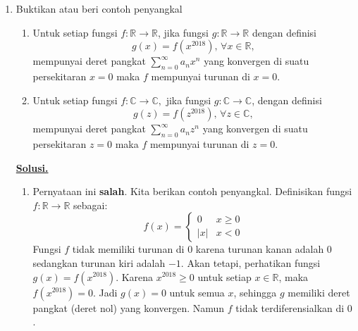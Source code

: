 \documentclass[12pt,twoside]{article}
\newenvironment{solution}
{
	\par\noindent\textbf{\underline{Solusi.}}\\
}
{
	\par
}
\begin{document}
\begin{enumerate}
  \item Buktikan atau beri contoh penyangkal
        \begin{enumerate}
          \item Untuk setiap fungsi $f:\mathbb{R}\to\mathbb{R}$, jika fungsi $g:\mathbb{R}\to\mathbb{R}$ dengan definisi
                \begin{equation*}
                  g(x) = f(x^{2018}), \,\forall x \in \mathbb{R},
                \end{equation*}
                mempunyai deret pangkat $\displaystyle\sum_{n=0}^{\infty} a_nx^n$ yang konvergen di suatu persekitaran $x=0$ maka $f$ mempunyai turunan di $x=0$.
          \item Untuk setiap fungsi $f:\mathbb{C}\to\mathbb{C},$ jika fungsi $g : \mathbb{C}\to\mathbb{C}$, dengan definisi
                \begin{equation*}
                  g(z) = f(z^{2018}),\,\forall z \in \mathbb{C},
                \end{equation*}
                mempunyai deret pangkat $\displaystyle\sum_{n=0}^{\infty} a_nz^n$ yang konvergen di suatu persekitaran $z=0$ maka $f$ mempunyai turunan di $z=0$.
        \end{enumerate}

        \begin{solution}
          \begin{enumerate}
            \item Pernyataan ini \textbf{salah}. Kita berikan contoh penyangkal.
                  Definisikan fungsi $f: \mathbb{R} \to \mathbb{R}$ sebagai:
                  \[ f(x) = \begin{cases} 0 & x \ge 0 \\ |x| & x < 0 \end{cases} \]
                  Fungsi $f$ tidak memiliki turunan di $0$ karena turunan kanan adalah $0$ sedangkan turunan kiri adalah $-1$.
                  Akan tetapi, perhatikan fungsi $g(x) = f(x^{2018})$. Karena $x^{2018} \ge 0$ untuk setiap $x \in \mathbb{R}$, maka $f(x^{2018}) = 0$.
                  Jadi $g(x) = 0$ untuk semua $x$, sehingga $g$ memiliki deret pangkat (deret nol) yang konvergen. Namun $f$ tidak terdiferensialkan di $0$.


\end{enumerate}
\end{solution}
\end{enumerate}
\end{document}
